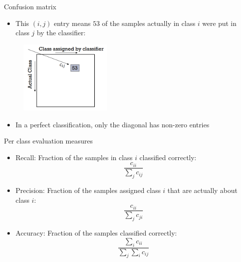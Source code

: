 \documentclass[serif, aspectratio=169]{beamer}
\begin{document}

\begin{frame}{Confusion matrix}
    \begin{itemize}
        \item This  $(i,j)$ entry means $53$ of the samples actually in class $i$ were put in class $j$ by the classifier:
    \end{itemize}
    \begin{figure}[h]
            \centering
            
            \includegraphics[width=0.4\textwidth]{pic/cmatrix.png}
            \end{figure}
    \begin{itemize}
        \item In a perfect classification, only the diagonal has non-zero entries
    \end{itemize}
\end{frame}
\begin{frame}{Per class evaluation measures}
    \begin{itemize}
        \item Recall: Fraction of the samples in class $i$ classified correctly:
        \[
          \frac{c_{ii}}{\sum _{j} c_{ij}}    
        \]
        \item Precision: Fraction of the samples assigned class $i$ that are actually about class $i$:
        \[
          \frac{c_{ii}}{\sum _{j} c_{ji}}
        \]
        \item Accuracy: Fraction of the samples classified correctly:
        \[
          \frac{\sum _i {c_{ii}}}{\sum _j \sum _i c_{ij}}
        \]
    \end{itemize}
    
\end{frame}
\end{document}
